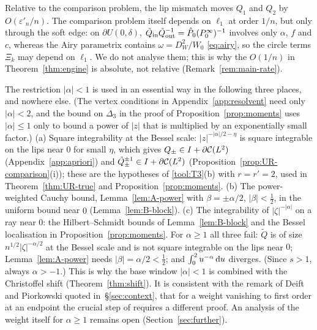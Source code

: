 \begin{remark}\label{rem:not-proved}
Relative to the comparison problem, the lip mismatch moves $Q_1$ and $Q_2$ by $O(\varepsilon'_n/n)$. The comparison
problem itself depends on $\ell_1$ at order $1/n$, but only through the soft edge: on $\partial U(0,\delta)$,
$\tilde Q_{\mathrm{in}}\tilde Q_{\mathrm{out}}^{-1}=\hat P_0(P^\infty_0)^{-1}$ involves only $\alpha$, $f$ and $c$, whereas the
Airy parametrix contains $\omega=D_W^2/W_0$ \eqref{eq:airy}, so the circle terms $\Xi_k$ may depend on $\ell_1$. We do
not analyse them; this is why the $O(1/n)$ in Theorem~\ref{thm:engine} is absolute, not relative
(Remark~\ref{rem:main-rate}).
\end{remark}

\begin{remark}\label{rem:alpha-ge-1}
The restriction $|\alpha|<1$ is used in an essential way in the following three places, and nowhere else. (The
vertex conditions in Appendix~\ref{app:resolvent} need only $|\alpha|<2$, and the bound on $\Delta_3$ in the proof of
Proposition~\ref{prop:moments} uses $|\alpha|\le1$ only to bound a power of $|z|$ that is multiplied by an exponentially
small factor.)
(a) Square integrability at the Bessel scale: $|z|^{-|\alpha|/2-\eta}$ is square integrable on the lips near $0$ for small
$\eta$, which gives $Q_\pm\in I+\partial\mathcal{C}(L^2)$  (Appendix~\ref{app:apriori}) and $\tilde Q_\pm^{\pm1}\in I+\partial\mathcal{C}(L^2)$
(Proposition~\ref{prop:UR-comparison}(i)); these are the hypotheses of \ref{tool:T3}(b) with $r=r'=2$, used in
Theorem~\ref{thm:UR-true} and Proposition~\ref{prop:moments}.
(b) The power-weighted Cauchy bound, Lemma~\ref{lem:A-power} with $\beta=\pm\alpha/2$, $|\beta|<\frac12$, in the uniform bound
near $0$ (Lemma~\ref{lem:B-block}).
(c) The integrability of $|\zeta|^{-|\alpha|}$ on a ray near $0$: the Hilbert--Schmidt bounds of Lemma~\ref{lem:B-block}
and the Bessel localisation in Proposition~\ref{prop:moments}.
For $\alpha\ge1$ all three fail: $\tilde Q$ is of size $n^{1/2}|\zeta|^{-\alpha/2}$ at the Bessel scale and is not square
integrable on the lips near $0$; Lemma~\ref{lem:A-power} needs $|\beta|=\alpha/2<\frac12$; and $\int_0^2u^{-\alpha}\,\mathrm{d} u$
diverges. (Since $s>1$, always $\alpha>-1$.) This is why the base window $|\alpha|<1$ is combined with the Christoffel
shift (Theorem~\ref{thm:shift}). It is consistent with the remark of Deift and Piorkowski quoted in~\S\ref{sec:context},
that for a weight vanishing to first order at an endpoint the crucial step of \cite{CD} requires a different proof. An
analysis of the weight itself for $\alpha\ge1$ remains open (Section~\ref{sec:further}).
\end{remark}
